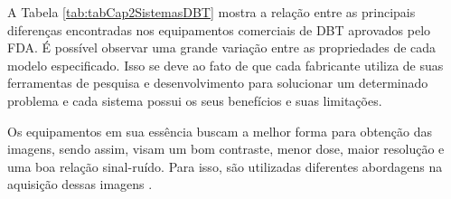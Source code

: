 A Tabela \ref{tab:tabCap2SistemasDBT} mostra a relação entre as principais diferenças encontradas nos equipamentos comerciais de \acs{DBT} aprovados pelo \acs{FDA}. É possível observar uma grande variação entre as propriedades de cada modelo especificado. Isso se deve ao fato de que cada fabricante utiliza de suas ferramentas de pesquisa e desenvolvimento para solucionar um determinado problema e cada sistema possui os seus benefícios e suas limitações. 

Os equipamentos em sua essência buscam a melhor forma para obtenção das imagens, sendo assim, visam um bom contraste, menor dose, maior resolução  e uma boa relação sinal-ruído. Para isso, são utilizadas diferentes abordagens na aquisição dessas imagens \cite{vedantham2015digital}. 




 
    

